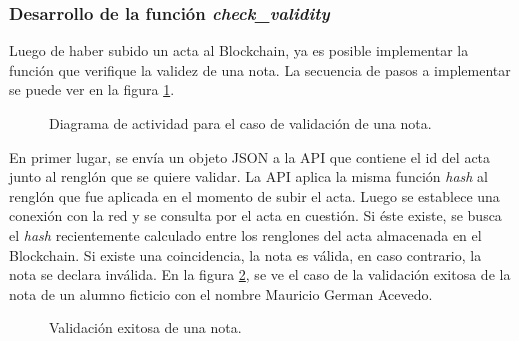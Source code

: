 \subsubsection{Desarrollo de la función \textit{check\_validity}}
Luego de haber subido un acta al Blockchain, ya es posible implementar la función que verifique la validez de una nota. La secuencia de pasos a implementar se puede ver en la figura  \ref{fig:validate_grade}.
\begin{figure}[H]
    \caption{Diagrama de actividad para el caso de validación de una nota.}
    \label{fig:validate_grade}
\end{figure}
En primer lugar, se envía un objeto JSON a la API que contiene el id del acta junto al renglón que se quiere validar. La API aplica la misma función \textit{hash} al renglón que fue aplicada en el momento de subir el acta. Luego se establece una conexión con la red y se consulta por el acta en cuestión. Si éste existe, se busca el \textit{hash} recientemente calculado entre los renglones del acta almacenada en el Blockchain. Si existe una coincidencia, la nota es válida, en caso contrario, la nota se declara inválida. En la figura \ref{fig:validate_grade_api}, se ve el caso de la validación exitosa de la nota de un alumno ficticio con el nombre Mauricio German Acevedo.
\begin{figure}[H]
    \caption{Validación exitosa de una nota.}
    \label{fig:validate_grade_api}
\end{figure}
